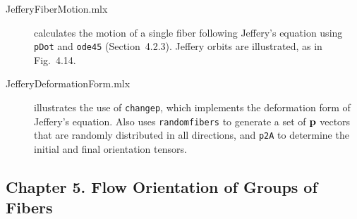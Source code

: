 \documentclass[11pt]{article}
\begin{document}
\begin{description}

    \item[JefferyFiberMotion.mlx]{calculates the motion of a single fiber following Jeffery's equation using \texttt{pDot} and \texttt{ode45} (Section~4.2.3).   Jeffery orbits are illustrated, as in Fig.~4.14.}

    \item[JefferyDeformationForm.mlx]{illustrates the use of \texttt{changep}, which implements the deformation form of Jeffery's equation.  Also uses \texttt{randomfibers} to generate a set of $\mathbf{p}$ vectors that are randomly distributed in all directions, and \texttt{p2A} to determine the initial and final orientation tensors.}
        
\end{description}


\subsection*{Chapter 5. Flow Orientation of Groups of Fibers} 
\end{document}
